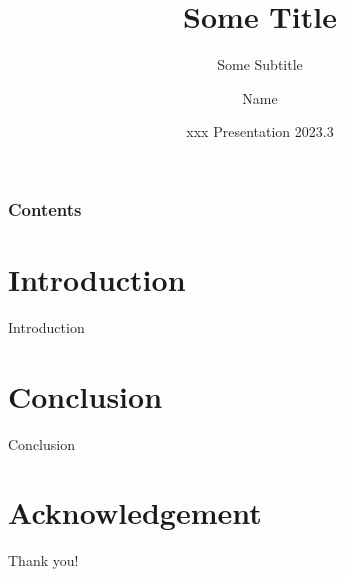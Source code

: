 \documentclass[10pt]{beamer}
\title[The University of Hong Kong]{Some Title
}
\subtitle{Some Subtitle}
\author[abc2-c]{Name}
\institute[xxx@hku.hk]{ The University of Hong Kong}
\date[xxx Presentation 2023.3]
{xxx Presentation 2023.3}
\begin{document}
\frame{\titlepage}
\begin{frame}
\frametitle{Contents}
\tableofcontents
\end{frame}
\section{Introduction}
    \begin{frame}{Introduction}
    \end{frame}


\section{Conclusion}
    \begin{frame}{Conclusion}
    \end{frame}



\section*{Acknowledgement}
\begin{frame}
\textcolor{myNewColorA}{\Huge{\centerline{Thank you!}}}
\end{frame}
\end{document}
